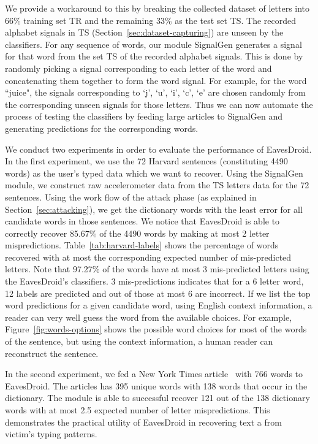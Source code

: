 \documentclass[11pt,conference]{IEEEtran}
\begin{document}
We provide a workaround to this by breaking the collected dataset of
letters into 66\% training set TR and the remaining 33\% as the test set TS.
The recorded
alphabet signals in TS (Section~\ref{sec:dataset-capturing}) are unseen by the classifiers.
For any sequence of words, our module SignalGen generates a
signal for that word from the set TS of the recorded alphabet signals.
This is done by randomly picking a signal corresponding to each letter of the word
and concatenating them together to form the word signal. For example, for the word
``juice", the signals corresponding to `j', `u', `i', `c', `e' are chosen randomly
from the corresponding unseen signals for those letters. Thus we can now automate
the process of testing the classifiers by feeding large articles to SignalGen
and generating predictions for the corresponding words.

We conduct two experiments in order to evaluate the performance of EavesDroid.
In the first experiment, we use the 72 Harvard sentences (constituting 4490 words) as the user's typed data
which we want to recover. Using the SignalGen module, we construct raw accelerometer
data from the TS letters data for the 72 sentences. Using the work flow
of the attack phase (as explained in Section~\ref{sec:attacking}), we get the dictionary
words with the least error for all candidate words in those sentences. We notice that
EavesDroid is able to correctly recover 85.67\% of the 4490 words by making at most 2 letter
mispredictions. Table~\ref{tab:harvard-labels}
shows the percentage of words recovered with at most the corresponding expected number of mis-predicted letters.
Note that 97.27\% of the words have at most 3 mis-predicted letters using
the EavesDroid's classifiers. 3 mis-predictions indicates that for a 6 letter word, 12 labels are predicted and out of
those at most 6 are incorrect. If we list the top word predictions for a given candidate word,
using English context information, a reader can very well guess the word from the available
choices. For example, Figure~\ref{fig:words-options} shows the possible word choices
for most of the words of the sentence, but using the context information, a human reader
can reconstruct the sentence.

In the second experiment, we fed a New York Times article~\cite{bats-nytimes} with 766 words
to EavesDroid. The articles has 395 unique words with 138 words that occur in the dictionary.
The module is able to successful recover 121 out of the 138 dictionary words with at most 2.5 expected
number of letter mispredictions. This demonstrates the practical utility of EavesDroid in recovering text a from victim's typing patterns.
\end{document}
